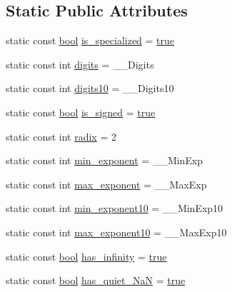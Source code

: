 \subsection*{Static Public Attributes}
\begin{DoxyCompactItemize}
\item 
static const \hyperlink{compiler_8h_abb452686968e48b67397da5f97445f5b}{bool} \hyperlink{class__Floating__limits_a7bf69463b667974854ae941799ec2848}{is\+\_\+specialized} = \hyperlink{compiler_8h_a41f9c5fb8b08eb5dc3edce4dcb37fee7}{true}
\item 
static const int \hyperlink{class__Floating__limits_a3806dda42e112dd03df2dafb1ceda84f}{digits} = \+\_\+\+\_\+\+Digits
\item 
static const int \hyperlink{class__Floating__limits_a89a2f278cb5adf1850eb9025a570d053}{digits10} = \+\_\+\+\_\+\+Digits10
\item 
static const \hyperlink{compiler_8h_abb452686968e48b67397da5f97445f5b}{bool} \hyperlink{class__Floating__limits_a1e78ab62e60c0d9faef1d3df89da9682}{is\+\_\+signed} = \hyperlink{compiler_8h_a41f9c5fb8b08eb5dc3edce4dcb37fee7}{true}
\item 
static const int \hyperlink{class__Floating__limits_aeca7d9a740d59373c6144cf1038af06f}{radix} = 2
\item 
static const int \hyperlink{class__Floating__limits_a5814f067642ab3448ece1a803e571a6d}{min\+\_\+exponent} = \+\_\+\+\_\+\+Min\+Exp
\item 
static const int \hyperlink{class__Floating__limits_a255ad0aea1d240e3f78d370b76984e2a}{max\+\_\+exponent} = \+\_\+\+\_\+\+Max\+Exp
\item 
static const int \hyperlink{class__Floating__limits_a47c916c33db0a7a4bc1d717994648052}{min\+\_\+exponent10} = \+\_\+\+\_\+\+Min\+Exp10
\item 
static const int \hyperlink{class__Floating__limits_a7e0e6cfca6c88235b2b5d3e09eae456d}{max\+\_\+exponent10} = \+\_\+\+\_\+\+Max\+Exp10
\item 
static const \hyperlink{compiler_8h_abb452686968e48b67397da5f97445f5b}{bool} \hyperlink{class__Floating__limits_a51a9b40a410fe6523829df82946f9977}{has\+\_\+infinity} = \hyperlink{compiler_8h_a41f9c5fb8b08eb5dc3edce4dcb37fee7}{true}
\item 
static const \hyperlink{compiler_8h_abb452686968e48b67397da5f97445f5b}{bool} \hyperlink{class__Floating__limits_a70a0355563c0a25e0704bd01ea336c18}{has\+\_\+quiet\+\_\+\+Na\+N} = \hyperlink{compiler_8h_a41f9c5fb8b08eb5dc3edce4dcb37fee7}{true}
\item 

\end{DoxyCompactItemize}
